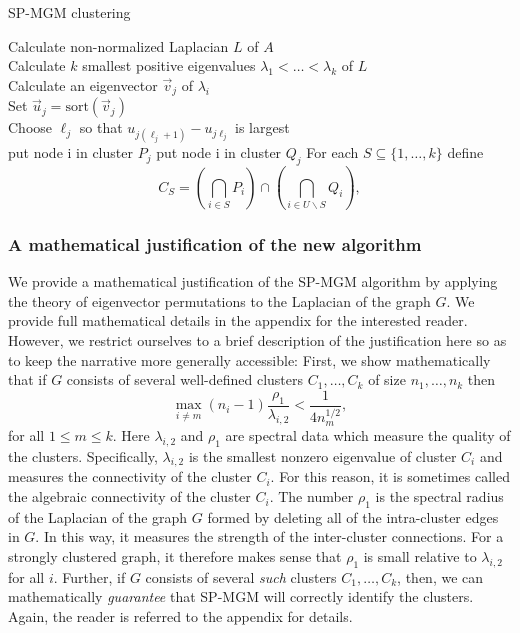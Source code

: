 \documentclass[10pt,journal,compsoc]{IEEEtran} %
\theoremstyle{definition}
\newcommand{\diff}{\backslash}
\begin{document}
\begin{algorithm}
    \caption{SP-MGM clustering} 
   Calculate
non-normalized Laplacian $L$ of $A$\\ Calculate $k$ smallest positive
eigenvalues $\lambda_1<\dots<\lambda_k$ of $L$\\ Calculate an
eigenvector $\vec v_j$ of $\lambda_i$\\ Set $\vec u_j =
\text{sort}(\vec v_j)$\\ Choose $\ell_j$ so that
$u_{j(\ell_j+1)}-u_{j\ell_j}$ is largest\\ 
{ put node i in cluster $P_j$ } { put node i in cluster $Q_j$ } For
each $S\subseteq \{1,\dots,k\}$ define
    $$C_S = \left(\bigcap_{i\in S}P_i\right)\cap\left(\bigcap_{i\in U\diff S}Q_i\right),$$
\end{algorithm}

\subsubsection{A mathematical justification of the new algorithm}
We provide a mathematical justification of the SP-MGM algorithm by applying the
theory of eigenvector permutations to the Laplacian of the graph $G$.  We
provide full mathematical details in the appendix for the interested
reader. However, we restrict ourselves to a brief description of the
justification here so as to keep the narrative more generally
accessible: First, we show mathematically that if $G$ consists of
several well-defined clusters $C_1,\dots, C_k$ of size $n_1,\dots,n_k$
then 
$$\max_{i\neq m} (n_i-1)\frac{\rho_1}{\lambda_{i,2}} <
\frac{1}{4n_m^{1/2}},$$ for all $1\leq m\leq k$. 
Here $\lambda_{i,2}$ and $\rho_1$ are spectral data which
measure the quality of the clusters.  Specifically, $\lambda_{i,2}$ is
the smallest nonzero eigenvalue of cluster $C_i$ and measures the
connectivity of the cluster $C_i$.  For this reason, it is sometimes
called the algebraic connectivity of the cluster $C_i$.  The number
$\rho_1$ is the spectral radius of the Laplacian of the graph $G$
formed by deleting all of the intra-cluster edges in $G$.  In this
way, it measures the strength of the inter-cluster connections.  For a
strongly clustered graph, it therefore makes sense that $\rho_1$ is
small relative to $\lambda_{i,2}$ for all $i$.  Further, if $G$
consists of several {\em such} clusters $C_1,\dots, C_k$, then, we can
mathematically {\em guarantee} that SP-MGM will correctly identify the
clusters.  Again, the reader is
referred to the appendix for details.
\end{document}
